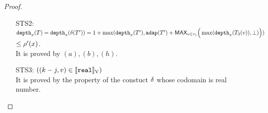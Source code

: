 \documentclass[a4paper,11pt]{article}
\theoremstyle{definition}
\begin{document}
\begin{proof}
\begin{mainitem}
\begin{enumerate}
\item [STS2:] $ \mathtt{depth}_{x}(T) = \mathtt{depth}_{x}(\delta (T')) =  1 +  \max(\mathtt{depth}_{x}(T'),
        \mathtt{adap}(T') + \textsf{MAX}_{v \in \tau_1} \Big(
          \max(\mathtt{depth}_{x}(T_3(v)), \bot )   \Big ) )$ \\
 $\leq      \rho'(x) $.\\
       It is proved by $(a),(b),(h)$.\\
\item[STS3:] $ ((k - j, v) \in [\![ \mathtt{real} ]\!]_{\text{V}})$\\
    It is proved by the property of the constuct $\delta$ whose
    codomain is real number. \\
        
\end{enumerate}



%
%


\end{mainitem}
\end{proof}
\end{document}
